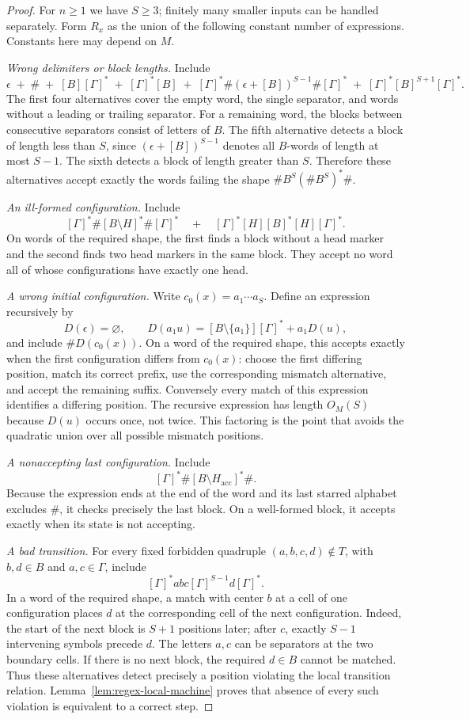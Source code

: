 \documentclass[11pt]{article}
\theoremstyle{definition}
\theoremstyle{remark}
\begin{document}
\begin{proof}
For $n\geq1$ we have $S\geq3$; finitely many smaller inputs can be
handled separately. Form $R_x$ as the union of the following constant
number of expressions. Constants here may depend on $M$.

\emph{Wrong delimiters or block lengths.} Include
\[
 \epsilon\; +\; \#\; +\; [B][\Gamma]^*\; +\;
 [\Gamma]^*[B]\; +\;
 [\Gamma]^*\#(\epsilon+[B])^{S-1}\#[\Gamma]^*
 \; +\;[\Gamma]^*[B]^{S+1}[\Gamma]^*.
\]
The first four alternatives cover the empty word, the single separator,
and words without a leading or trailing separator. For a remaining
word, the blocks between consecutive separators consist of letters of
$B$. The fifth alternative detects a block of length less than $S$,
since $(\epsilon+[B])^{S-1}$ denotes all $B$-words of length at most
$S-1$. The sixth detects a block of length greater than $S$. Therefore
these alternatives accept exactly the words failing the shape
$\#B^S(\#B^S)^*\#$.

\emph{An ill-formed configuration.} Include
\[
 [\Gamma]^*\#[B\setminus H]^*\#[\Gamma]^*
 \quad+\quad
 [\Gamma]^*[H][B]^*[H][\Gamma]^*.
\]
On words of the required shape, the first finds a block without a head
marker and the second finds two head markers in the same block. They
accept no word all of whose configurations have exactly one head.

\emph{A wrong initial configuration.} Write $c_0(x)=a_1\cdots a_S$.
Define an expression recursively by
\[
 D(\epsilon)=\varnothing,\qquad
 D(a_1u)=[B\setminus\{a_1\}][\Gamma]^*+a_1D(u),
\]
and include $\#D(c_0(x))$.
On a word of the required shape, this accepts exactly when the first
configuration differs from $c_0(x)$: choose the first differing
position, match its correct prefix, use the corresponding mismatch
alternative, and accept the remaining suffix. Conversely every match
of this expression identifies a differing position. The recursive
expression has length $O_M(S)$ because $D(u)$ occurs once, not twice.
This factoring is the point that avoids the quadratic union over all
possible mismatch positions.

\emph{A nonaccepting last configuration.} Include
\[
 [\Gamma]^*\#[B\setminus H_{\mathrm{acc}}]^*\#.
\]
Because the expression ends at the end of the word and its last starred
alphabet excludes $\#$, it checks precisely the last block. On a
well-formed block, it accepts exactly when its state is not accepting.

\emph{A bad transition.} For every fixed forbidden quadruple
$(a,b,c,d)\notin T$, with $b,d\in B$ and $a,c\in\Gamma$, include
\[
 [\Gamma]^*abc[\Gamma]^{S-1}d[\Gamma]^*.
\]
In a word of the required shape, a match with center $b$ at a cell of
one configuration places $d$ at the corresponding cell of the next
configuration. Indeed, the start of the next block is $S+1$ positions
later; after $c$, exactly $S-1$ intervening symbols precede $d$.
The letters $a,c$ can be separators at the two boundary cells.
If there is no next block, the required $d\in B$ cannot be matched.
Thus these alternatives detect precisely a position violating the
local transition relation. Lemma~\ref{lem:regex-local-machine} proves
that absence of every such violation is equivalent to a correct step.


\end{proof}
\end{document}
